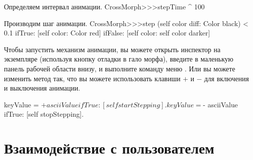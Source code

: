 \documentclass[a4paper,10pt,twoside]{book}
\begin{document}
\begin{method}{Определяем интервал анимации.}
CrossMorph>>>stepTime
	^ 100
\end{method}
\begin{method}{Производим шаг анимации.}
CrossMorph>>>step
	(self color diff: Color black) < 0.1
		ifTrue: [self color: Color red]
		ifFalse: [self color: self color darker]
\end{method}
\noindent
Чтобы запустить механизм анимации, вы можете открыть инспектор на экземпляре  (используя кнопку отладки \debugHandle{} в гало морфа), введите  в маленькую панель рабочей области внизу, и выполните команду меню .
Или вы можете изменить метод  так, что вы можете использовать клавиши $+$ и $-$ для включения и выключения анимации.


\begin{code}{}
	keyValue = $+ asciiValue 
		ifTrue: [self startStepping].
	keyValue = $- asciiValue
		ifTrue: [self stopStepping].
\end{code}


\section{Взаимодействие с пользователем}
\end{document}
